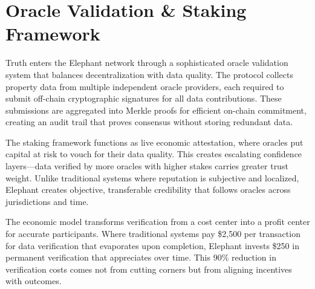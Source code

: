 \section{Oracle Validation \& Staking Framework}

Truth enters the Elephant network through a sophisticated oracle validation system that balances decentralization with data quality. The protocol collects property data from multiple independent oracle providers, each required to submit off-chain cryptographic signatures for all data contributions. These submissions are aggregated into Merkle proofs for efficient on-chain commitment, creating an audit trail that proves consensus without storing redundant data.

The staking framework functions as live economic attestation, where oracles put capital at risk to vouch for their data quality. This creates escalating confidence layers—data verified by more oracles with higher stakes carries greater trust weight. Unlike traditional systems where reputation is subjective and localized, Elephant creates objective, transferable credibility that follows oracles across jurisdictions and time.

The economic model transforms verification from a cost center into a profit center for accurate participants. Where traditional systems pay \$2,500 per transaction for data verification that evaporates upon completion, Elephant invests \$250 in permanent verification that appreciates over time. This 90\% reduction in verification costs comes not from cutting corners but from aligning incentives with outcomes.

